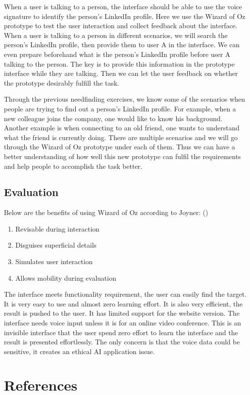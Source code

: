 \documentclass[
	letterpaper, %
]{jdf}
\begin{document}
When a user is talking to a person, the interface should be able to use the voice signature to identify the person's LinkedIn profile. Here we use the Wizard of Oz prototype to test the user interaction and collect feedback about the interface. When a user is talking to a person in different scenarios, we will search the person's LinkedIn profile, then provide them to user A in the interface. We can even prepare beforehand what is the person's LinkedIn profile before user A talking to the person. The key is to provide this information in the prototype interface while they are talking. Then we can let the user feedback on whether the prototype desirably fulfill the task.

Through the previous needfinding exercises, we know some of the scenarios when people are trying to find out a person's LinkedIn profile. For example, when a new colleague joins the company, one would like to know his background. Another example is when connecting to an old friend, one wants to understand what the friend is currently doing. There are multiple scenarios and we will go through the Wizard of Oz prototype under each of them. Thus we can have a better understanding of how well this new prototype can fulfil the requirements and help people to accomplish the task better.

\subsection{Evaluation}
Below are the benefits of using Wizard of Oz according to Joyner: (\cite{joyner2016b})

\begin{enumerate}
    \item Revisable during interaction
    \item Disguises superficial details
    \item Simulates user interaction
    \item Allows mobility during evaluation
\end{enumerate}


The interface meets functionality requirement, the user can easily find the target. It is very easy to use and almost zero learning effort. It is also very efficient, the result is pushed to the user. It has limited support for the website version. The interface needs voice input unless it is for an online video conference. This is an invisible interface that the user spend zero effort to learn the interface and the result is presented effortlessly. The only concern is that the voice data could be sensitive, it creates an ethical AI application issue.

\section{References}

\printbibliography[heading=none]
\end{document}
